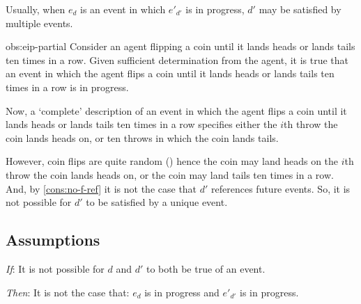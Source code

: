 \begin{note}
  \begin{observation}%
    \label{obs:eip-partial}%
    Usually, when \(e_{d}\) is an event in which \(e'_{d'}\) is in progress, \(d'\) may be satisfied by multiple events.\newline
  \end{observation}

  \begin{motivation}{obs:eip-partial}
    Consider an agent flipping a coin until it lands heads or lands tails ten times in a row.
    Given sufficient determination from the agent, it is true that an event in which the agent flips a coin until it lands heads or lands tails ten times in a row is in progress.

    Now, a `complete' description of an event in which the agent flips a coin until it lands heads or lands tails ten times in a row specifies either the \(i\)th throw the coin lands heads on, or ten throws in which the coin lands tails.

    However, coin flips are quite random (\cite{Gelman:2002ww}) hence the coin may land heads on the \(i\)th throw the coin lands heads on, or the coin may land tails ten times in a row.
    And, by \autoref{cons:no-f-ref} it is not the case that \(d'\) references future events.
    So, it is not possible for \(d'\) to be satisfied by a unique event.
  \end{motivation}
\end{note}



\subsection{Assumptions}
\label{sec:assumptions-1}


\begin{note}
  \begin{assumption}[Exclusivity]
    \label{assu:p:ex}
    \vspace{-\baselineskip}
    \begin{itenum}
    \item[\emph{If}:]
      It is not possible for \(d\) and \(d'\) to both be true of an event.
    \item[\emph{Then}:]
      It is not the case that: \(e_{d}\) is in progress and \(e'_{d'}\) is in progress.
    \end{itenum}
    \vspace{-\baselineskip}
  \end{assumption}
\end{note}



